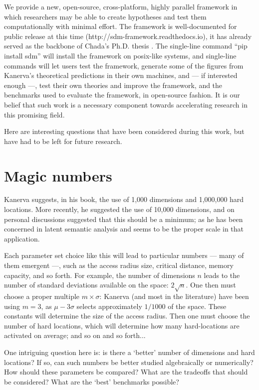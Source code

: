 We provide a new, open-source, cross-platform, highly parallel framework in which researchers may be able to create hypotheses and test them computationally with minimal effort. The framework is well-documented for public release at this time (http://sdm-framework.readthedocs.io), it has already served as the backbone of Chada's Ph.D. thesis \citep{chada2016you}. The single-line command ``pip install sdm'' will install the framework on posix-like systems, and single-line commands will let users test the framework, generate some of the figures from Kanerva's theoretical predictions in their own machines, and --- if interested enough ---, test their own theories and improve the framework, and the benchmarks used to evaluate the framework, in open-source fashion. It is our belief that such work is a necessary component towards accelerating research in this promising field.

Here are interesting questions that have been considered during this work, but have had to be left for future research.



\section{Magic numbers}

Kanerva suggests, in his book, the use of 1,000 dimensions and 1,000,000 hard locations.  More recently, he suggested the use of 10,000 dimensions, and on personal discussions suggested that this should be a minimum; as he has been concerned in latent semantic analysis and seems to be the proper scale in that application.

Each parameter set choice like this will lead to particular numbers --- many of them emergent ---, such as the access radius size, critical distance, memory capacity, and so forth.  For example, the number of dimensions $n$ leads to the number of standard deviations available on the space: $2 \sqrt{n}$.  One then must choose a proper multiple $m\times\sigma$: Kanerva (and most in the literature) have been using $m=3$, as $\mu-3\sigma$ selects approximately $1/1000$ of the space. These constants will determine the size of the access radius.  Then one must choose the number of hard locations, which will determine how many hard-locations are activated on average; and so on and so forth...

One intriguing question here is:  is there a `better' number of dimensions and hard locations?  If so, can such numbers be better studied algebraically or numerically? How should these parameters be compared?  What are the tradeoffs that should be considered?  What are the `best' benchmarks possible?

